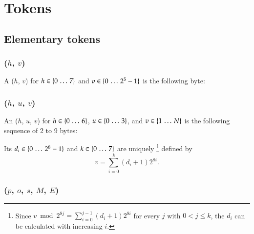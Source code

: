 
\section{Tokens}
\label{sec:tokens}

\subsection{Elementary tokens}

\subsubsection{\DborMinimalToken(\texorpdfstring{$h$, $v$}{h, v})}
\hypertarget{sec:def:MinimalToken}{}

A \DborMinimalToken($h$, $v$) for $h \in \{0 \,\ldots\, 7\}$ and $v \in \{0 \,\ldots\, 2^5 - 1\}$
is the following byte:



\subsubsection{\DborNaturalToken(\texorpdfstring{$h$, $u$, $v$}{h, u, v})}
\hypertarget{sec:def:NaturalToken}{}

An \DborNaturalToken($h$, $u$, $v$)
for $h \in \{0 \,\ldots\, 6\}$,
$u \in \{0 \,\ldots\, 3\}$,
and $v \in \{1 \,\ldots\, N\}$
is the following sequence of 2 to 9 bytes:


Its $d_i \in \{0 \,\ldots\, 2^8 - 1\}$ and $k \in \{0 \,\ldots\, 7\}$ are uniquely%
\footnote{%
    Since $v \bmod 2^{8 j} = \sum_{i = 0}^{j - 1} (d_i + 1) 2^{8 i}$ for every $j$ with $0 < j \le k$,
    the $d_i$ can be calculated with increasing $i$.
}
defined by
\begin{equation}
    v =\sum_{i = 0}^k (d_i + 1) 2^{8 i}.
\end{equation}


\subsubsection{\DborBinaryRationalToken(\texorpdfstring{$p$, $o$, $s$, $M$, $E$}{p, o, s, M, E})}
\hypertarget{sec:def:BinaryRationalToken}{}

